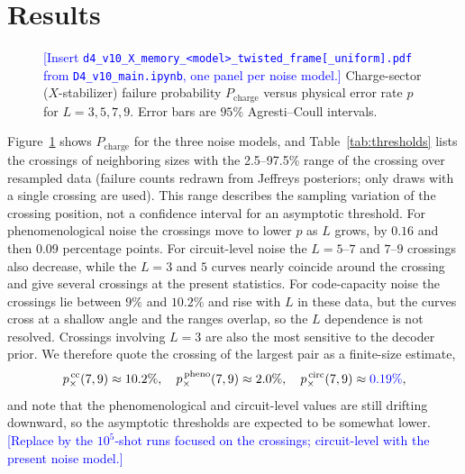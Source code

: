 \documentclass[a4paper]{article}
\newcommand{\blue}[1]{\textcolor{blue}{#1}}
\begin{document}
\section{Results}
\label{sec:results}

\begin{figure}[t]
  \centering
  \fbox{\rule{0pt}{50mm}\rule{0.82\linewidth}{0pt}}
  \caption{\blue{[Insert \texttt{d4\_v10\_X\_memory\_<model>\_twisted\_frame[\_uniform].pdf} from \texttt{D4\_v10\_main.ipynb}, one panel per noise model.]} Charge-sector ($X$-stabilizer) failure probability $P_{\mathrm{charge}}$ versus physical error rate $p$ for $L=3,5,7,9$. Error bars are $95\%$ Agresti--Coull intervals.}
  \label{fig:threshold}
\end{figure}

Figure~\ref{fig:threshold} shows $P_{\mathrm{charge}}$ for the three noise models, and Table~\ref{tab:thresholds} lists the crossings of neighboring sizes with the 2.5--97.5\% range of the crossing over resampled data (failure counts redrawn from Jeffreys posteriors; only draws with a single crossing are used). This range describes the sampling variation of the crossing position, not a confidence interval for an asymptotic threshold. For phenomenological noise the crossings move to lower $p$ as $L$ grows, by $0.16$ and then $0.09$ percentage points. For circuit-level noise the $L=5$--$7$ and $7$--$9$ crossings also decrease, while the $L=3$ and $5$ curves nearly coincide around the crossing and give several crossings at the present statistics. For code-capacity noise the crossings lie between $9\%$ and $10.2\%$ and rise with $L$ in these data, but the curves cross at a shallow angle and the ranges overlap, so the $L$ dependence is not resolved. Crossings involving $L=3$ are also the most sensitive to the decoder prior. We therefore quote the crossing of the largest pair as a finite-size estimate,
\begin{equation}
  p_\times^{\,\mathrm{cc}}(7,9)\approx10.2\%,\quad
  p_\times^{\,\mathrm{pheno}}(7,9)\approx2.0\%,\quad
  p_\times^{\,\mathrm{circ}}(7,9)\approx\blue{0.19\%},
\end{equation}
and note that the phenomenological and circuit-level values are still drifting downward, so the asymptotic thresholds are expected to be somewhat lower. \blue{[Replace by the $10^5$-shot runs focused on the crossings; circuit-level with the present noise model.]}
\end{document}
